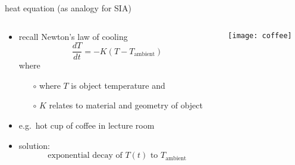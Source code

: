 \begin{frame}{heat equation (as analogy for SIA)}
\label{slide:heatcompare}

\begin{columns}
\begin{column}{0.75\textwidth}
\begin{itemize}
\item recall Newton's law of cooling
	$$\frac{dT}{dt} = -K (T-T_{\text{ambient}})$$
where
  \begin{itemize}
  \item[$\circ$] where $T$ is object temperature and
  \item[$\circ$] $K$ relates to material and geometry of object
  \end{itemize}

\bigskip
\item e.g.~hot cup of coffee in lecture room

\bigskip
\item solution:
  $$\text{exponential decay of $T(t)$ to $T_{\text{ambient}}$}$$
\end{itemize}
\end{column}

\begin{column}{0.25\textwidth}
\vspace{1.0in}

\texttt{[image: coffee]}
\end{column}
\end{columns}
\end{frame}


